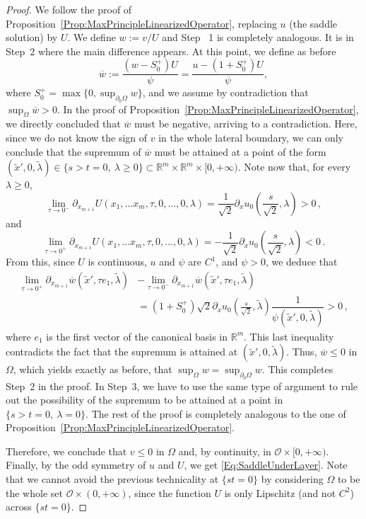 \documentclass[12pt,reqno]{amsart}
\theoremstyle{definition}
\theoremstyle{remark}
\newcommand{\con}[1]{\mathbb{#1}}
\newcommand{\R}{\con{R}} %
\newcommand{\ocal}{\mathcal{O}}
\numberwithin{equation}{section}
\begin{document}
\begin{proof}
We follow the proof of Proposition~\ref{Prop:MaxPrincipleLinearizedOperator}, replacing $u$ (the saddle solution) by $U$. We define $w:= v/U$ and Step~ 1 is completely analogous. It is in Step~2 where the main difference appears. At this point, we define as before 
$$\overline{w} := \frac{(w - S_0^+)U}{\psi} = \frac{u - (1+S_0^+)U}{\psi},$$
where $S_0^+ = \max \{0, \sup_{\partial_0 \Omega} w\}$, and we assume by contradiction that $\sup_{\Omega} \overline{w}>0$. In the proof of Proposition~\ref{Prop:MaxPrincipleLinearizedOperator}, we directly concluded that $\overline{w}$ must be negative, arriving to a contradiction. Here, since we do not know the sign of $v$ in the whole lateral boundary, we can only conclude that the supremum of $\overline{w}$ must be attained at a point of the form $(\tilde{x}',0, \tilde{\lambda})\in \{s > t= 0,\ \lambda \geq 0\}\subset \R^m \times \R^m \times [0,+\infty)$. Note now that, for every $\lambda \geq 0$,
\begin{equation}
\label{Eq:ULipschitz1}
\lim_{\tau\to 0^-} \partial_{x_{m+1}}  U(x_1,...x_m,\tau,0,...,0,\lambda) = \frac{1}{\sqrt{2}}\partial_xu_0\left(\frac{s}{\sqrt{2}},\lambda\right)>0\,, 
\end{equation}
and
\begin{equation}
\label{Eq:ULipschitz2}
\lim_{\tau\to 0^+} \partial_{x_{m+1}} U(x_1,...x_m,\tau,0,...,0,\lambda) = -\frac{1}{\sqrt{2}}\partial_xu_0\left(\frac{s}{\sqrt{2}},\lambda\right) <0\,.
\end{equation}
From this, since $U$ is continuous, $u$ and $\psi$ are $C^1$, and $\psi > 0$, we deduce that
\begin{align*}
	\lim_{\tau\to 0^+} \partial_{x_{m+1}} \overline{w} (\tilde{x}',\tau e_1,\tilde{\lambda}) &- \lim_{\tau \to 0^-} \partial_{x_{m+1}} \overline{w} (\tilde{x}',\tau e_1,\tilde{\lambda}) \\
	&= (1+S_0^+) \sqrt{2} \partial_xu_0\left(\frac{s}{\sqrt{2}},\tilde{\lambda} \right) \dfrac{1}{\psi(\tilde{x}',0, \tilde{\lambda})}>0\,,  
\end{align*}
where $e_1$ is the first vector of the canonical basis in $\R^{m}$. This last inequality contradicts the fact that the supremum is attained at $(\tilde{x}',0, \tilde{\lambda})$. Thus, $\overline{w}\leq 0$ in $\Omega$, which yields exactly as before,  that $\sup _\Omega w = \sup_{\partial_0 \Omega} w$. This completes Step~2 in the proof. In Step~3, we have to use the same type of argument to rule out the possibility of the supremum to be attained at a point in $\{s > t = 0,\ \lambda = 0\}$. The rest of the proof is completely analogous to the one of Proposition~\ref{Prop:MaxPrincipleLinearizedOperator}.

Therefore, we conclude that $v\leq 0$ in $\Omega$ and, by continuity, in $\ocal\times[0,+\infty)$. Finally, by the odd symmetry of $u$ and $U$, we get \eqref{Eq:SaddleUnderLayer}. Note that we cannot avoid the previous technicality at $\{st=0\}$ by considering $\Omega$ to be the whole set $\ocal \times (0,+\infty)$, since the function $U$ is only Lipschitz (and not $C^2$) across $\{st=0\}$.
\end{proof}
\end{document}

